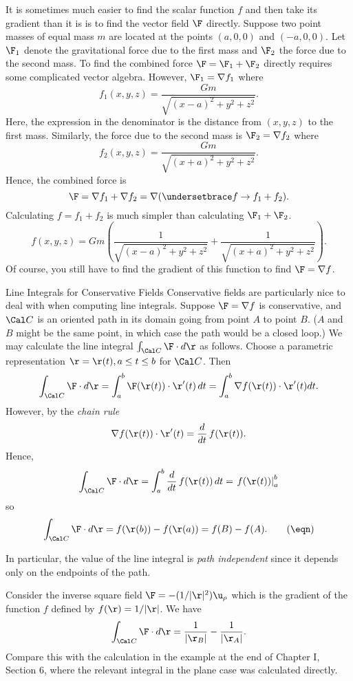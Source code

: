 It is sometimes much easier to find the scalar function $f$ 
and then take its gradient than it is is to find the 
  vector field $\F$ directly.
\goodbreak
\nextex
\xdef\ExOne{\en}
  Suppose two point masses 
of equal mass $m$ are located at the points $(a,0,0)$ and $(-a,0,0)$.
Let $\F_1$ denote the gravitational force 
due to the first mass and $\F_2$ the force
due to the second mass.
To find the combined force $\F = \F_1 + \F_2$
directly requires some complicated
vector algebra.  However, 
$\F_1 = \nabla f_1$ where 
$$
f_1(x,y,z) = \frac{Gm}{\sqrt{(x - a)^2 + y^2 + z^2}}.
$$
%
Here, the expression in the denominator is the distance from
$(x,y,z)$ to the first mass.  Similarly, the force due to
the second mass is $\F_2 = \nabla f_2$ where
$$
f_2(x,y,z) =
  \frac{Gm}{\sqrt{(x + a)^2 + y^2 + z^2}}.
$$
Hence, the combined force is 
$$\F = \nabla f_1 + \nabla f_2 = \nabla (\undersetbrace f\to{f_1 + f_2}).
$$ 
Calculating $f = f_1 + f_2$ is much simpler than calculating $\F_1 + \F_2$.
$$
f(x,y,z) = Gm\left (\frac 1
{\sqrt{(x - a)^2 + y^2 + z^2}} +
 \frac 1{\sqrt{(x + a)^2 + y^2 + z^2}} \right ).
$$
Of course, you still have to find
the gradient of this function to find  $\F = \nabla f$.

\subhead Line Integrals for Conservative Fields \endsubhead
Conservative fields are particularly nice to deal with when
computing line integrals.   Suppose $\F = \nabla f$ is
conservative, and $\Cal C$ is an oriented
 path in its domain going from
point $A$ to point $B$.  ($A$ and $B$ might be the same point,
in which case the path would be a closed loop.)  We may
calculate the line integral $\int_{\Cal C} \F\cdot d\r$
as follows.  Choose a parametric representation $\r = \r(t),
a \le t \le b$ for $\Cal C$.  Then
$$
\int_{\Cal C} \F\cdot d\r =
  \int_a^b \F(\r(t))\cdot \r'(t) \, dt =
  \int_a^b \nabla f(\r(t))\cdot \r'(t) dt.
$$
However, by the {\it chain rule\/}
$$
   \nabla f(\r(t))\cdot \r'(t) = \frac d{dt}\,f(\r(t)).
$$
Hence,
$$
\int_{\Cal C} \F\cdot d\r =\int_a^b \frac d{dt}\,f(\r(t)) \, dt
      = \left . f(\r(t))\right|_a^b
$$
so
\nexteqn
\xdef\EqOne{\eqn}
$$
\int_{\Cal C} \F\cdot d\r = f(\r(b)) - f(\r(a)) = f(B) - f(A). \tag\eqn
$$

In particular, the value of
the line integral is {\it path independent\/} since it depends
only on the endpoints of the path.

\nextex
{}  Consider the inverse square field
 $\F = -(1/|\r|^2)\u_{\rho}$  which is the gradient of the function
$f$ defined by
$f(\r) = 1/|\r|$.  We have
$$
 \int_{\Cal C} \F\cdot d\r = \frac 1{|\r_B|} - \frac 1{|\r_A|}.
$$
Compare this with the calculation in the example at the end
of Chapter I, Section 6, where the relevant integral in the
plane case was calculated directly.
\endexample

